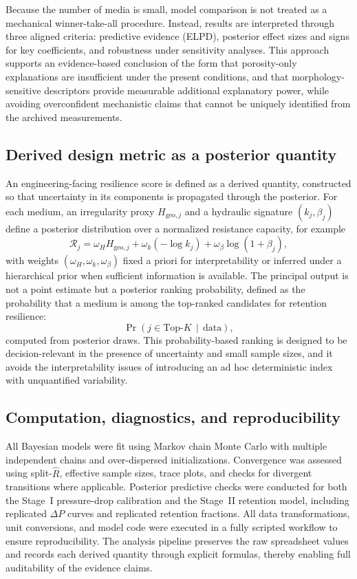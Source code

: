 \documentclass[11pt]{article}
\begin{document}
Because the number of media is small, model comparison is not treated as a mechanical winner-take-all procedure. Instead, results are interpreted through three aligned criteria: predictive evidence (ELPD), posterior effect sizes and signs for key coefficients, and robustness under sensitivity analyses. This approach supports an evidence-based conclusion of the form that porosity-only explanations are insufficient under the present conditions, and that morphology-sensitive descriptors provide measurable additional explanatory power, while avoiding overconfident mechanistic claims that cannot be uniquely identified from the archived measurements.

\subsection{Derived design metric as a posterior quantity}
An engineering-facing resilience score is defined as a derived quantity, constructed so that uncertainty in its components is propagated through the posterior. For each medium, an irregularity proxy $H_{\mathrm{geo},j}$ and a hydraulic signature $(k_j,\beta_j)$ define a posterior distribution over a normalized resistance capacity, for example
\begin{equation}
\mathcal{R}_j = \omega_H H_{\mathrm{geo},j} + \omega_k(-\log k_j) + \omega_\beta \log(1+\beta_j),
\end{equation}
with weights $(\omega_H,\omega_k,\omega_\beta)$ fixed a priori for interpretability or inferred under a hierarchical prior when sufficient information is available. The principal output is not a point estimate but a posterior ranking probability, defined as the probability that a medium is among the top-ranked candidates for retention resilience:
\begin{equation}
\Pr\!\left(j \in \mathrm{Top}\text{-}K \,\middle|\, \text{data}\right),
\end{equation}
computed from posterior draws. This probability-based ranking is designed to be decision-relevant in the presence of uncertainty and small sample sizes, and it avoids the interpretability issues of introducing an ad hoc deterministic index with unquantified variability.

\subsection{Computation, diagnostics, and reproducibility}
All Bayesian models were fit using Markov chain Monte Carlo with multiple independent chains and over-dispersed initializations. Convergence was assessed using split-$\hat{R}$, effective sample sizes, trace plots, and checks for divergent transitions where applicable. Posterior predictive checks were conducted for both the Stage~I pressure-drop calibration and the Stage~II retention model, including replicated $\Delta P$ curves and replicated retention fractions. All data transformations, unit conversions, and model code were executed in a fully scripted workflow to ensure reproducibility. The analysis pipeline preserves the raw spreadsheet values and records each derived quantity through explicit formulas, thereby enabling full auditability of the evidence claims.
\end{document}
